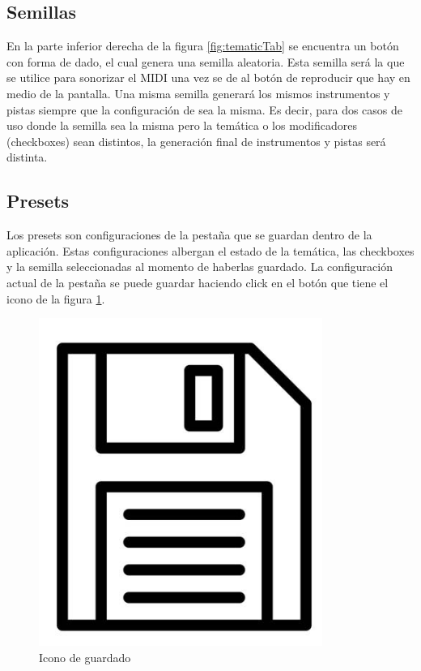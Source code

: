 \subsection{Semillas}
\label{subsec:app:seed}
En la parte inferior derecha de la figura \ref{fig:tematicTab} se encuentra un botón con forma de dado, el cual genera una semilla aleatoria. Esta semilla será la que se utilice para sonorizar el MIDI una vez se de al botón de reproducir que hay en medio de la pantalla. Una misma semilla generará los mismos instrumentos y pistas siempre que la configuración de  sea la misma. Es decir, para dos casos de uso donde la semilla sea la misma pero la temática o los modificadores (checkboxes) sean distintos, la generación final de instrumentos y pistas será distinta.

\subsection{Presets}
\label{subsec:app:presets}
Los presets son configuraciones de la pestaña \tematicTabName{} que se guardan dentro de la aplicación. Estas configuraciones albergan el estado de la temática, las checkboxes y la semilla seleccionadas al momento de haberlas guardado. La configuración actual de la pestaña \tematicTabName{} se puede guardar haciendo click en el botón que tiene el icono de la figura \ref{fig:savePresetIcon}.

\begin{figure}[h]
    \begin{center}
        \includegraphics[scale=0.25]{Imagenes/Bitmap/saveIcon.png}
    \end{center}
    \caption{Icono de guardado}
    \label{fig:savePresetIcon}
\end{figure}

